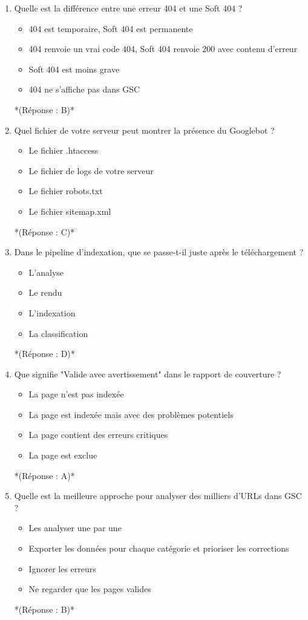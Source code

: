 \documentclass[12pt,a4paper,twoside]{report}
\begin{document}
\begin{enumerate}
\item Quelle est la différence entre une erreur 404 et une Soft 404 ?
\begin{itemize}
\item[A)] 404 est temporaire, Soft 404 est permanente
\item[B)] 404 renvoie un vrai code 404, Soft 404 renvoie 200 avec contenu d'erreur
\item[C)] Soft 404 est moins grave
\item[D)] 404 ne s'affiche pas dans GSC
\end{itemize}
*(Réponse : B)*

\item Quel fichier de votre serveur peut montrer la présence du Googlebot ?
\begin{itemize}
\item[A)] Le fichier .htaccess
\item[B)] Le fichier de logs de votre serveur
\item[C)] Le fichier robots.txt
\item[D)] Le fichier sitemap.xml
\end{itemize}
*(Réponse : C)*

\item Dans le pipeline d'indexation, que se passe-t-il juste après le téléchargement ?
\begin{itemize}
\item[A)] L'analyse
\item[B)] Le rendu
\item[C)] L'indexation
\item[D)] La classification
\end{itemize}
*(Réponse : D)*

\item Que signifie "Valide avec avertissement" dans le rapport de couverture ?
\begin{itemize}
\item[A)] La page n'est pas indexée
\item[B)] La page est indexée mais avec des problèmes potentiels
\item[C)] La page contient des erreurs critiques
\item[D)] La page est exclue
\end{itemize}
*(Réponse : A)*

\item Quelle est la meilleure approche pour analyser des milliers d'URLs dans GSC ?
\begin{itemize}
\item[A)] Les analyser une par une
\item[B)] Exporter les données pour chaque catégorie et prioriser les corrections
\item[C)] Ignorer les erreurs
\item[D)] Ne regarder que les pages valides
\end{itemize}
*(Réponse : B)*


\end{enumerate}
\end{document}
